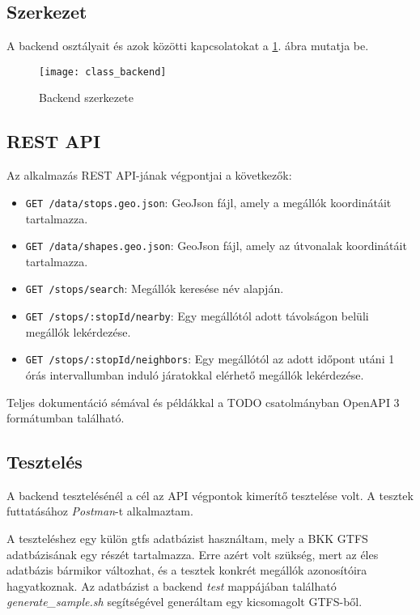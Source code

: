 \subsection{Szerkezet}

A backend osztályait és azok közötti kapcsolatokat a \ref{fig:backend-structure}. ábra mutatja be.

\begin{figure}[H]
    \centering
    \texttt{[image: class\_backend]}
    \caption{Backend szerkezete}
    \label{fig:backend-structure}
\end{figure}

\subsection{REST API}

Az alkalmazás REST API-jának végpontjai a következők:

\begin{itemize}
    \item \texttt{GET /data/stops.geo.json}: GeoJson fájl, amely a megállók koordinátáit tartalmazza.
    \item \texttt{GET /data/shapes.geo.json}: GeoJson fájl, amely az útvonalak koordinátáit tartalmazza.
    \item \texttt{GET /stops/search}: Megállók keresése név alapján.
    \item \texttt{GET /stops/:stopId/nearby}: Egy megállótól adott távolságon belüli megállók lekérdezése.
    \item \texttt{GET /stops/:stopId/neighbors}: Egy megállótól az adott időpont utáni 1 órás intervallumban induló járatokkal elérhető megállók lekérdezése.
\end{itemize}

Teljes dokumentáció sémával és példákkal a TODO csatolmányban OpenAPI 3 formátumban található.

\subsection{Tesztelés}

A backend tesztelésénél a cél az API végpontok kimerítő tesztelése volt. A tesztek futtatásához \textit{Postman}-t alkalmaztam.

A teszteléshez egy külön gtfs adatbázist használtam, mely a BKK GTFS adatbázisának egy részét tartalmazza. Erre azért volt szükség, mert az éles adatbázis bármikor változhat, és a tesztek konkrét megállók azonosítóira hagyatkoznak. Az adatbázist a backend \textit{test} mappájában található \textit{generate\_sample.sh} segítségével generáltam egy kicsomagolt GTFS-ből.

